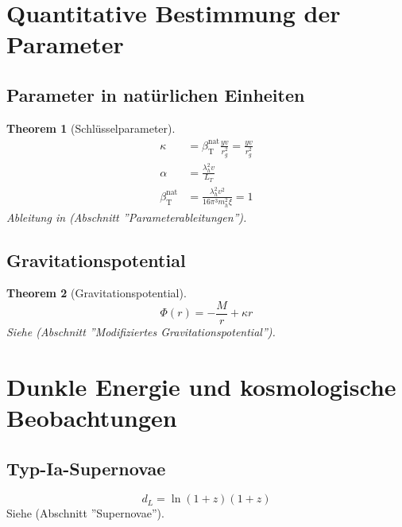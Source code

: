 \documentclass[a4paper,12pt]{article}
\newtheorem{theorem}{Theorem}[section]
\theoremstyle{definition}
\theoremstyle{remark}
\newcommand{\betaT}{\beta_{\text{T}}}
\begin{document}
	\section{Quantitative Bestimmung der Parameter}
	
	\subsection{Parameter in natürlichen Einheiten}
	
	\begin{theorem}[Schlüsselparameter]
		\begin{align}
			\kappa &= \betaT^{\text{nat}} \frac{y v}{r_g^2} = \frac{y v}{r_g^2} \\
			\alpha &= \frac{\lambda_h^2 v}{L_T} \\
			\betaT^{\text{nat}} &= \frac{\lambda_h^2 v^2}{16\pi^3 m_h^2 \xi} = 1
		\end{align}
		Ableitung in \cite{pascher_params_2025} (Abschnitt ''Parameterableitungen'').
	\end{theorem}
	
	\subsection{Gravitationspotential}
	
	\begin{theorem}[Gravitationspotential]
		\begin{equation}
			\Phi(r) = -\frac{M}{r} + \kappa r
		\end{equation}
		Siehe \cite{pascher_galaxies_2025} (Abschnitt ''Modifiziertes Gravitationspotential'').
	\end{theorem}
	
	\section{Dunkle Energie und kosmologische Beobachtungen}
	
	\subsection{Typ-Ia-Supernovae}
	
	\begin{equation}
		d_L = \ln(1+z) (1+z)
	\end{equation}
	Siehe \cite{pascher_messdifferenzen_2025} (Abschnitt ''Supernovae'').
	
\end{document}
